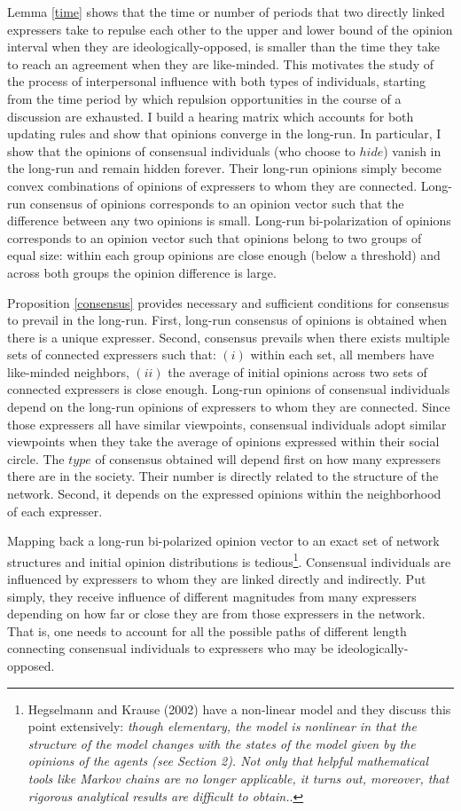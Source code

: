 \documentclass{article}
\begin{document}
\bigskip
Lemma \ref{time} shows that the time or number of periods that two directly linked expressers take to repulse each other to the upper and lower bound of the opinion interval when they are ideologically-opposed, is smaller than the time they take to reach an agreement when they are like-minded. This motivates the study of the process of interpersonal influence with both types of individuals, starting from the time period by which repulsion opportunities in the course of a discussion are exhausted. I build a hearing matrix which accounts for both updating rules and show that opinions converge in the long-run. In particular, I show that the opinions of consensual individuals (who choose to $hide$) vanish in the long-run and remain hidden forever. Their long-run opinions simply become convex combinations of opinions of expressers to whom they are connected. Long-run consensus of opinions corresponds to an opinion vector such that the difference between any two opinions is small. Long-run bi-polarization of opinions corresponds to an opinion vector such that opinions belong to two groups of equal size: within each group opinions are close enough (below a threshold) and across both groups the opinion difference is large. 

Proposition \ref{consensus} provides necessary and sufficient conditions for consensus to prevail in the long-run. First, long-run consensus of opinions is obtained when there is a unique expresser. Second, consensus prevails when there exists multiple sets of connected expressers such that: $(i)$ within each set, all members have like-minded neighbors, $(ii)$ the average of initial opinions across two sets of connected expressers is close enough. Long-run opinions of consensual individuals depend on the long-run opinions of expressers to whom they are connected. Since those expressers all have similar viewpoints, consensual individuals adopt similar viewpoints when they take the average of opinions expressed within their social circle. The $type$ of consensus obtained will depend first on how many expressers there are in the society. Their number is directly related to the structure of the network. Second, it depends on the expressed opinions within the neighborhood of each expresser.  

Mapping back a long-run bi-polarized opinion vector to an exact set of  network structures and initial opinion distributions is tedious\footnote{Hegselmann and Krause (2002)\cite{hegselmann} have a non-linear model and they discuss this point extensively: \textit{though elementary, the model is nonlinear in that the structure of the model changes with the states of the model given by the opinions of the agents (see Section 2). Not only that helpful mathematical tools like Markov chains are no longer applicable, it turns out, moreover, that rigorous analytical results are difficult to obtain.}.}. Consensual individuals are influenced by expressers to whom they are linked directly and indirectly. Put simply, they receive influence of different magnitudes from many expressers depending on how far or close they are from those expressers in the network. That is, one needs to account for all the possible paths of different length connecting consensual individuals to expressers who may be ideologically-opposed. 
\end{document}
